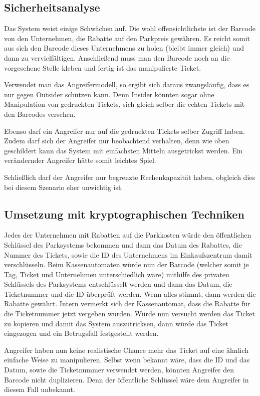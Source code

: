 \documentclass[ngerman]{fbi-aufgabenblatt}
\begin{document}
\subsection{Sicherheitsanalyse}

Das System weist einige Schwächen auf. Die wohl offensichtlichste ist der Barcode von den Unternehmen, die Rabatte auf den Parkpreis gewähren. Es reicht somit aus sich den Barcode dieses Unternehmens zu holen (bleibt immer gleich) und dann zu vervielfältigen. Anschließend muss man den Barcode noch an die vorgesehene Stelle kleben und fertig ist das manipulierte Ticket.

Verwendet man das Angreifermodell, so ergibt sich daraus zwangsläufig, dass es nur gegen Outsider schützen kann. Denn Insider könnten sogar ohne Manipulation von gedruckten Tickets, sich gleich selber die echten Tickets mit den Barcodes versehen.

Ebenso darf ein Angreifer nur auf die gedruckten Tickets selber Zugriff haben. Zudem darf sich der Angreifer nur beobachtend verhalten, denn wie oben geschildert kann das System mit einfachsten Mitteln ausgetrickst werden. Ein verändernder Angreifer hätte somit leichtes Spiel.

Schließlich darf der Angreifer nur begrenzte Rechenkapazität haben, obgleich dies bei diesem Szenario eher unwichtig ist.
\subsection{Umsetzung mit kryptographischen Techniken}

Jedes der Unternehmen mit Rabatten auf die Parkkosten würde den öffentlichen Schlüssel des Parksystems bekommen und dann das Datum des Rabattes, die Nummer des Tickets, sowie die ID des Unternehmens im Einkaufszentrum damit verschlüsseln. Beim Kassenautomaten würde nun der Barcode (welcher somit je Tag, Ticket und Unternehmen unterschiedlich wäre) mithilfe des privaten Schlüssels des Parksystems entschlüsselt werden und dann das Datum, die Ticketnummer und die ID überprüft werden. Wenn alles stimmt, dann werden die Rabatte gewährt. Intern vermerkt sich der Kassenautomat, dass die Rabatte für die Ticketnummer jetzt vergeben wurden. Würde nun versucht werden das Ticket zu kopieren und damit das System auszutricksen, dann würde das Ticket eingezogen und ein Betrugsfall festgestellt werden.

Angreifer haben nun keine realistische Chance mehr das Ticket auf eine ähnlich einfache Weise zu manipulieren. Selbst wenn bekannt wäre, dass die ID und das Datum, sowie die Ticketnummer verwendet werden, könnten Angreifer den Barcode nicht duplizieren. Denn der öffentliche Schlüssel wäre dem Angreifer in diesem Fall unbekannt.
\end{document}

